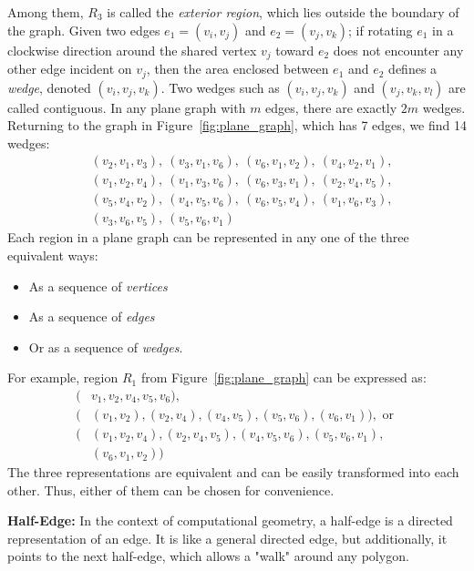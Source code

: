 Among them, \( R_3 \) is called the \emph{exterior region}, which lies outside the boundary of the graph.
Given two edges \( e_1 = (v_i, v_j) \) and \( e_2 = (v_j, v_k) \); if rotating \( e_1 \) in a clockwise direction around the shared vertex \( v_j \) toward \( e_2 \) does not encounter any other edge incident on \( v_j \), then the area enclosed between \( e_1 \) and \( e_2 \) defines a \emph{wedge}, denoted \( (v_i, v_j, v_k) \). Two wedges such as \( (v_i, v_j, v_k) \) and \( (v_j, v_k, v_l) \) are called contiguous.
In any plane graph with \( m \) edges, there are exactly \( 2m \) wedges. Returning to the graph in Figure~\ref{fig:plane_graph}, which has 7 edges, we find 14 wedges:
\begin{align*}
& (v_2, v_1, v_3),\ (v_3, v_1, v_6),\ (v_6, v_1, v_2),\ (v_4, v_2, v_1), \\
&  (v_1, v_2, v_4),\ (v_1, v_3, v_6),\ (v_6, v_3, v_1),\ (v_2, v_4, v_5), \\
& (v_5, v_4, v_2),\ (v_4, v_5, v_6),\ (v_6, v_5, v_4),\ (v_1, v_6, v_3), \\
& (v_3, v_6, v_5),\ (v_5, v_6, v_1)
\end{align*}
Each region in a plane graph can be represented in any one of the three equivalent ways:
\begin{itemize}
    \item As a sequence of \emph{vertices}
    \item As a sequence of \emph{edges}
    \item Or as a sequence of \emph{wedges}.
\end{itemize}
For example, region \( R_1 \) from Figure~\ref{fig:plane_graph} can be expressed as:
\begin{align*}
(&v_1, v_2, v_4, v_5, v_6), \\
(&(v_1, v_2), (v_2, v_4), (v_4, v_5), (v_5, v_6), (v_6, v_1)), \text{ or } \\
(&(v_1, v_2, v_4), (v_2, v_4, v_5), (v_4, v_5, v_6), (v_5, v_6, v_1),\\
&(v_6, v_1, v_2))
\end{align*}
The three representations are equivalent and can be easily transformed into each other. Thus, either of them can be chosen for convenience.

\textbf{Half-Edge:} In the context of computational geometry, a half-edge is a directed representation of an edge. It is like a general directed edge, but additionally, it points to the next half-edge, which allows a "walk" around any polygon.

